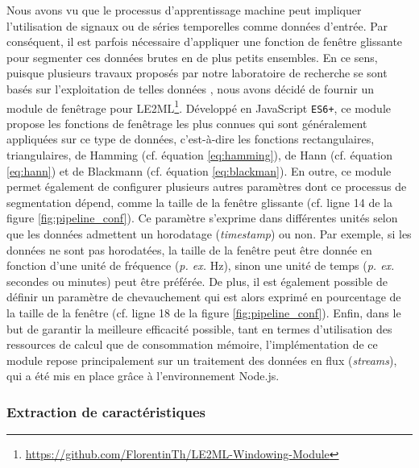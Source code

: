 Nous avons vu que le processus d'apprentissage machine peut impliquer l'utilisation de signaux ou de séries temporelles comme données d'entrée. Par conséquent, il est parfois nécessaire d'appliquer une fonction de fenêtre glissante pour segmenter ces données brutes en de plus petits ensembles. En ce sens, puisque plusieurs travaux proposés par notre laboratoire de recherche se sont basés sur l'exploitation de telles données \citep{Thullier2017,Chapron2018,Bouchard2020}, nous avons décidé de fournir un module de fenêtrage pour \acs{LE2ML}\footnote{\url{https://github.com/FlorentinTh/LE2ML-Windowing-Module}}. Développé en JavaScript \texttt{ES6+}, ce module propose les fonctions de fenêtrage les plus connues qui sont généralement appliquées sur ce type de données, c'est-à-dire les fonctions rectangulaires, triangulaires, de Hamming (cf. équation \ref{eq:hamming}), de Hann (cf. équation \ref{eq:hann}) et de Blackmann (cf. équation \ref{eq:blackman}). En outre, ce module permet également de configurer plusieurs autres paramètres dont ce processus de segmentation dépend, comme la taille de la fenêtre glissante (cf. ligne 14 de la figure \ref{fig:pipeline_conf}). Ce paramètre s'exprime dans différentes unités selon que les données admettent un horodatage (\textit{timestamp}) ou non. Par exemple, si les données ne sont pas horodatées, la taille de la fenêtre peut être donnée en fonction d'une unité de fréquence (\textit{p. ex.} Hz), sinon une unité de temps (\textit{p. ex.} secondes ou minutes) peut être préférée. De plus, il est également possible de définir un paramètre de chevauchement qui est alors exprimé en pourcentage de la taille de la fenêtre (cf. ligne 18 de la figure \ref{fig:pipeline_conf}). Enfin, dans le but de garantir la meilleure efficacité possible, tant en termes d'utilisation des ressources de calcul que de consommation mémoire, l'implémentation de ce module repose principalement sur un traitement des données en flux (\textit{streams}), qui a été mis en place grâce à l'environnement Node.js.

\subsubsection{Extraction de caractéristiques}

